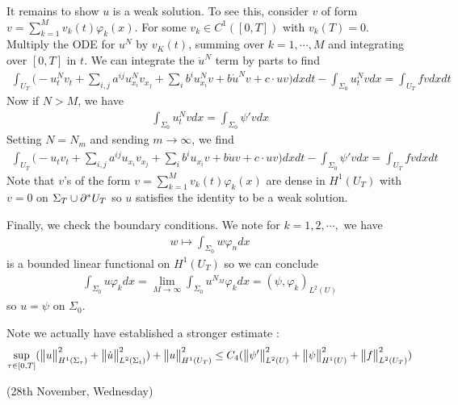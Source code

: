 \documentclass[12pt,a4paper]{report}
\newenvironment{proof}
{\begin{changemargin}{1cm}{0.5cm} 
	}%
	{\end{changemargin}
}
\begin{document}
\begin{proof}
\quad It remains to show $u$ is a weak solution. To see this, consider $v$ of form $v= \sum_{k=1}^M v_k(t) \varphi_k(x)$. For some $v_k \in C^1([0,T])$ with $v_k(T) =0$. Multiply the ODE for $u^N$ by $v_K(t)$, summing over $k=1, \cdots, M$ and integrating over $[0,T]$ in $t$. We can integrate the $\ddot{u}^N$ term by parts to find
\begin{align*}
\int_{U_T} \Big( -u_t^N v_t + \sum_{i,j}a^{ij}u_{x_i}^N v_{x_j} + \sum_{i}b^i u^N_{x_i} v + b\dot{u}^N v + c\cdot uv \Big) dxdt - \int_{\Sigma_0} u_t^N v dx = \int_{U_T} fv dxdt
\end{align*}
Now if $N>M$, we have
\begin{align*}
\int_{\Sigma_0} u^N_t vdx = \int_{\Sigma_0} \psi' vdx 
\end{align*}
Setting $N = N_m$ and sending $m\rightarrow \infty$, we find 
\begin{align*}
\int_{U_T} \Big( -u_t v_t + \sum_{i,j} a^{ij} u_{x_i}v_{x_j} + \sum_i b^i u_{x_i} v + b\dot{u} v + c\cdot uv \Big) dxdt - \int_{\Sigma_0} \psi' v dx = \int_{U_T} fv dxdt
\end{align*}
Note that $v$'s of the form $v= \sum_{k=1}^M v_k(t) \varphi_k(x)$ are dense in $H^1(U_T)$ with $v=0$ on $\Sigma_T \cup \partial^* U_T$ so $u$ satisfies  the identity to be a weak solution.

\quad Finally, we check the boundary conditions. We note for $k=1,2,\cdots,$ we have
\begin{align*}
w \mapsto \int_{\Sigma_0} w \varphi_n dx
\end{align*}
is a bounded linear functional on $H^1(U_T)$ so we can conclude
\begin{align*}
\int_{\Sigma_0} u\varphi_k dx = \lim_{M\rightarrow \infty} \int_{\Sigma_0} u^{N_M} \varphi_k dx = (\psi, \varphi_k)_{L^2(U)} 
\end{align*}
so $u = \psi$ on $\Sigma_0$.

\quad Note we actually have established a stronger estimate :
\begin{align*}
\sup_{\tau \in [0,T]} ( \bigl\lVert u\bigr\rVert_{H^1(\Sigma_{\tau})}^2 + \bigl\lVert\dot{u}\bigr\rVert_{L^2(\Sigma_t)}^2) + \bigl\lVert u\bigr\rVert_{H^1(U_T)}^2 \leq C_4(\bigl\lVert\psi'\bigr\rVert_{L^2(U)}^2 + \bigl\lVert\psi\bigr\rVert_{H^1(U)}^2 + \bigl\lVert f\bigr\rVert_{L^2(U_T)}^2)
\end{align*}

\eop
\end{proof}
\s

\newday

(28th November, Wednesday)
\s
\end{document}
